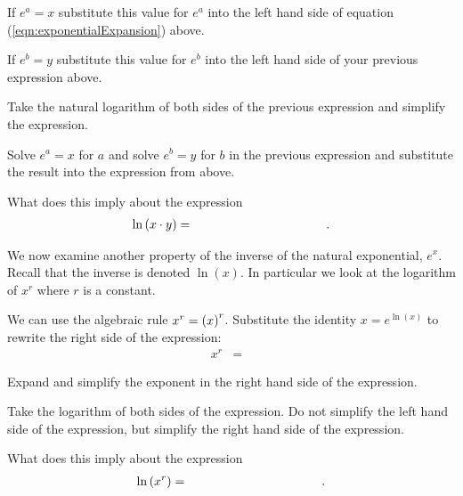 \begin{problem}
\begin{subproblem}
  \item If $e^a=x$ substitute this value for $e^a$ into the left hand
    side of equation (\ref{eqn:exponentialExpansion}) above.
    
    \vspace{4em}
    
  \item If $e^b=y$ substitute this value for $e^b$ into the left hand
    side of your previous expression above.
    
    \vspace{4em}
    
  \item Take the natural logarithm of both sides of 
    the previous expression and simplify the expression.
    
    \vfill
    
  \item Solve $e^a=x$ for $a$ and solve $e^b=y$ for $b$ in the
    previous expression and substitute the result into the expression
    from above.
    
    \vfill
    
  \item What does this imply about the expression 
    \begin{eqnarray*}
      \ln\lp x \cdot y \rp & = & \hspace{10em}.
    \end{eqnarray*}
  \end{subproblem}

  \clearpage

\item We now examine another property of the inverse of the natural
  exponential, $e^x$. Recall that the inverse is denoted $\ln(x)$. In
  particular we look at the logarithm of $x^r$ where $r$ is a
  constant.
  \begin{subproblem}
  \item We can use the algebraic rule $x^r=\left( x \right)^r$. Substitute
    the identity $x=e^{\ln(x)}$ to rewrite the right side of the
    expression: 
    \begin{eqnarray}
      \label{eqn:exponentialMultiplication}
      x^r & = & 
    \end{eqnarray}

    
    \item Expand and simplify the exponent in the right hand side of
      the expression.
      \vfill
    \item Take the logarithm of both sides of the expression. Do not
      simplify the left hand side of the expression, but simplify the
      right hand side of the expression.
      \vfill
    \item What does this imply about the expression
    \begin{eqnarray*}
      \ln\lp x^r \rp & = & \hspace{10em}.
    \end{eqnarray*}
  \end{subproblem}


\end{problem}

